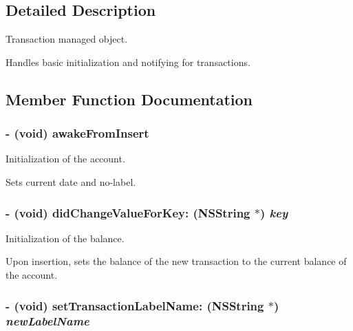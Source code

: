 \subsection{Detailed Description}
Transaction managed object. 

Handles basic initialization and notifying for transactions. 

\subsection{Member Function Documentation}
\hypertarget{interface_z_x_transaction_m_o_a2f4e9d356ac363d2cee7ad11ec990b0}{
\subsubsection[{awakeFromInsert}]{\setlength{\rightskip}{0pt plus 5cm}- (void) awakeFromInsert }}
\label{interface_z_x_transaction_m_o_a2f4e9d356ac363d2cee7ad11ec990b0}


Initialization of the account. 

Sets current date and no-label. \hypertarget{interface_z_x_transaction_m_o_e9fe1fcc56305cf1457db7404eb485dc}{
\subsubsection[{didChangeValueForKey:}]{\setlength{\rightskip}{0pt plus 5cm}- (void) didChangeValueForKey: (NSString $\ast$) {\em key}}}
\label{interface_z_x_transaction_m_o_e9fe1fcc56305cf1457db7404eb485dc}


Initialization of the balance. 

Upon insertion, sets the balance of the new transaction to the current balance of the account. \hypertarget{interface_z_x_transaction_m_o_faa2aa9521435114abca89cb0bbd23e5}{
\subsubsection[{setTransactionLabelName:}]{\setlength{\rightskip}{0pt plus 5cm}- (void) setTransactionLabelName: (NSString $\ast$) {\em newLabelName}}}
\label{interface_z_x_transaction_m_o_faa2aa9521435114abca89cb0bbd23e5}


